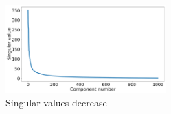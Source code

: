 \documentclass[10pt,a4paper]{article}
\begin{document}
\begin{figure}[!htb]
  \centering
  \includegraphics[width=0.55\textwidth]{Graphs/pca_decrease.pdf}
  \caption{Singular values decrease}\label{pca_decrease}
\end{figure}
\end{document}
